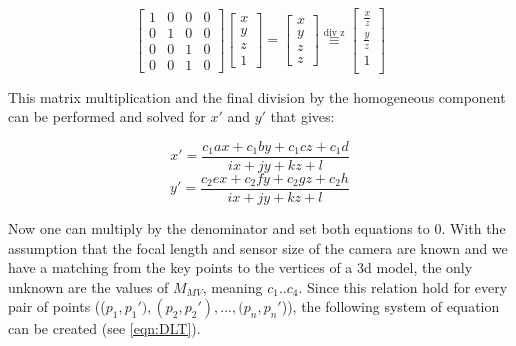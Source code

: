 \documentclass[conference]{IEEEtran}
\begin{document}
\begin{equation}
    \begin{bmatrix}
        1 & 0 & 0 & 0 \\
        0 & 1 & 0 & 0 \\
        0 & 0 & 1 & 0 \\
        0 & 0 & 1 & 0
    \end{bmatrix}
    \begin{bmatrix}
        x \\
        y \\
        z \\
        1
    \end{bmatrix}
    =
    \begin{bmatrix}
        x \\
        y \\
        z \\
        z
    \end{bmatrix}
    \overset{\text{div z}}{\equiv}
    \begin{bmatrix}
        \frac{x}{z} \\
        \frac{y}{z} \\
        1           \\
    \end{bmatrix}
\end{equation}

This matrix multiplication and the final division by the homogeneous component can be performed and solved for $x'$ and $y'$ that gives:

\begin{equation}
    x' = \frac{c_1 a x + c_1 b y + c_1 c z + c_1 d}{ix + jy + kz + l}
\end{equation}
\begin{equation}
    y' = \frac{c_2 e x + c_2 f y + c_2 g z + c_2 h}{ix + jy + kz + l}
\end{equation}

Now one can multiply by the denominator and set both equations to 0. With the assumption that the focal length and sensor size of the camera are known and we have a matching from the key points to the vertices of a 3d model, the only unknown are the values of $M_{MV}$, meaning $c_{1}..c_{4}$. Since this relation hold for every pair of points (($p_{1} , p_{1}'), (p_{2} , p_{2}'), ..., (p_{n}, p_{n}'$)), the following system of equation can be created (see \ref{eqn:DLT}).
\end{document}
